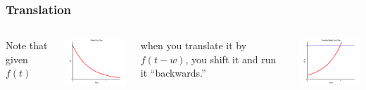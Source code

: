 \begin{frame}
  \frametitle{Translation}

  \begin{columns}

    \vfill

    Note that given $f(t)$

    \centerline{\includegraphics[width=5cm]{img/exponentialDecay}}

    \vfill

    when you translate it by $f(t-w)$, you shift it and run it
    ``backwards.''
    
    \centerline{\includegraphics[width=5cm]{img/backwardsExponentialDecay}}

  \end{columns}

\end{frame}

